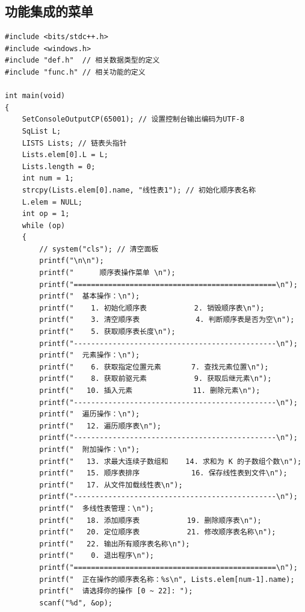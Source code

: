\documentclass[supercite]{Experimental_Report}
\theoremstyle{definition}
\begin{document}
\newpage

\subsection*{功能集成的菜单}
\begin{lstlisting}
#include <bits/stdc++.h>
#include <windows.h>
#include "def.h"  // 相关数据类型的定义
#include "func.h" // 相关功能的定义

int main(void)
{
    SetConsoleOutputCP(65001); // 设置控制台输出编码为UTF-8
    SqList L;
    LISTS Lists; // 链表头指针
    Lists.elem[0].L = L;
    Lists.length = 0;
    int num = 1;
    strcpy(Lists.elem[0].name, "线性表1"); // 初始化顺序表名称
    L.elem = NULL;
    int op = 1;
    while (op)
    {
        // system("cls"); // 清空面板
        printf("\n\n");
        printf("      顺序表操作菜单 \n");
        printf("===============================================\n");
        printf("  基本操作：\n");
        printf("    1. 初始化顺序表           2. 销毁顺序表\n");
        printf("    3. 清空顺序表             4. 判断顺序表是否为空\n");
        printf("    5. 获取顺序表长度\n");
        printf("-----------------------------------------------\n");
        printf("  元素操作：\n");
        printf("    6. 获取指定位置元素       7. 查找元素位置\n");
        printf("    8. 获取前驱元素           9. 获取后继元素\n");
        printf("   10. 插入元素              11. 删除元素\n");
        printf("-----------------------------------------------\n");
        printf("  遍历操作：\n");
        printf("   12. 遍历顺序表\n");
        printf("-----------------------------------------------\n");
        printf("  附加操作：\n");
        printf("   13. 求最大连续子数组和    14. 求和为 K 的子数组个数\n");
        printf("   15. 顺序表排序            16. 保存线性表到文件\n");
        printf("   17. 从文件加载线性表\n");
        printf("-----------------------------------------------\n");
        printf("  多线性表管理：\n");
        printf("   18. 添加顺序表           19. 删除顺序表\n");
        printf("   20. 定位顺序表           21. 修改顺序表名称\n");
        printf("   22. 输出所有顺序表名称\n");
        printf("    0. 退出程序\n");
        printf("===============================================\n");
        printf("  正在操作的顺序表名称：%s\n", Lists.elem[num-1].name);
        printf("  请选择你的操作 [0 ~ 22]: ");
        scanf("%d", &op);


\end{lstlisting}
\end{document}

